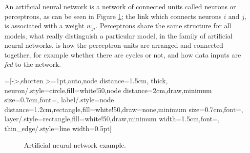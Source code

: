  
An artificial neural network is a network of connected units called neurons or perceptrons, as can be seen in Figure \ref{fully_connected}; the link which connects neurons $i$ and $j$, is associated with a weight $w_{ji}$. Perceptrons share the same
structure for all models, what really distinguish a particular model, in the family of artificial neural networks, is how the perceptron units are arranged and connected together, for example whether there are cycles
or not, and how data inputs are \textit{fed} to the network. 

=[->,shorten >=1pt,auto,node distance=1.5cm,
  thick,
  neuron/.style={circle,fill=white!50,node distance=2cm,draw,minimum size=0.7cm,font=\sffamily\normalsize},
  label/.style={node distance=1.2cm,rectangle,fill=white!50,draw=none,minimum size=0.7cm,font=\sffamily\normalsize},
  layer/.style={rectangle,fill=white!50,draw,minimum width=1.5cm,font=\sffamily\Large},
  thin_edge/.style={line width=0.5pt}]
\begin{figure}[h]
 \centering
{}
\caption{Artificial neural network example.}
\label{fully_connected}
\end{figure}

